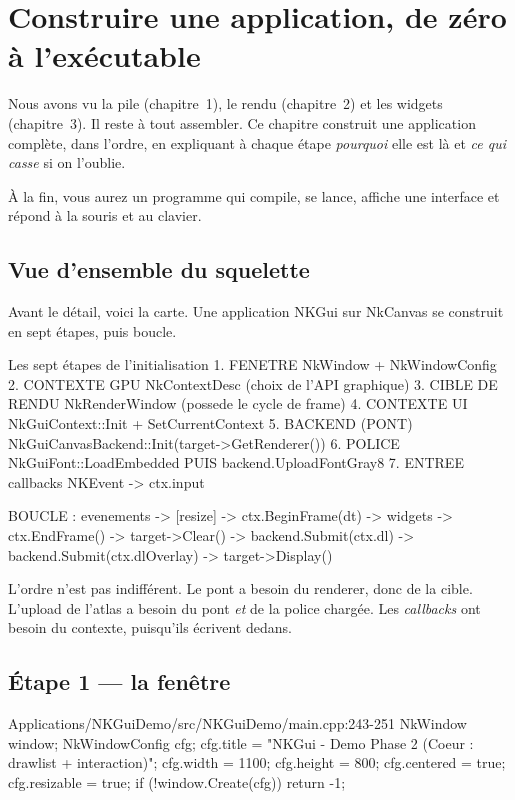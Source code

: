 \chapter{Construire une application, de zéro à l'exécutable}

Nous avons vu la pile (chapitre~1), le rendu (chapitre~2) et les widgets
(chapitre~3). Il reste à tout assembler. Ce chapitre construit une application
complète, dans l'ordre, en expliquant à chaque étape \emph{pourquoi} elle est là
et \emph{ce qui casse} si on l'oublie.

À la fin, vous aurez un programme qui compile, se lance, affiche une interface et
répond à la souris et au clavier.

\section{Vue d'ensemble du squelette}

Avant le détail, voici la carte. Une application NKGui sur NkCanvas se construit
en sept étapes, puis boucle.

\begin{nkcode}{Les sept étapes de l'initialisation}
1. FENETRE          NkWindow + NkWindowConfig
2. CONTEXTE GPU     NkContextDesc  (choix de l'API graphique)
3. CIBLE DE RENDU   NkRenderWindow (possede le cycle de frame)
4. CONTEXTE UI      NkGuiContext::Init + SetCurrentContext
5. BACKEND (PONT)   NkGuiCanvasBackend::Init(target->GetRenderer())
6. POLICE           NkGuiFont::LoadEmbedded  PUIS  backend.UploadFontGray8
7. ENTREE           callbacks NKEvent -> ctx.input

BOUCLE :
   evenements -> [resize] -> ctx.BeginFrame(dt) -> widgets -> ctx.EndFrame()
   -> target->Clear() -> backend.Submit(ctx.dl) -> backend.Submit(ctx.dlOverlay)
   -> target->Display()
\end{nkcode}

L'ordre n'est pas indifférent. Le pont a besoin du renderer, donc de la cible.
L'upload de l'atlas a besoin du pont \emph{et} de la police chargée. Les
\emph{callbacks} ont besoin du contexte, puisqu'ils écrivent dedans.

\section{Étape 1 — la fenêtre}

\begin{nkcode}{Applications/NKGuiDemo/src/NKGuiDemo/main.cpp:243-251}
    NkWindow window;
    NkWindowConfig cfg;
    cfg.title = "NKGui - Demo Phase 2 (Coeur : drawlist + interaction)";
    cfg.width = 1100;
    cfg.height = 800;
    cfg.centered = true;
    cfg.resizable = true;
    if (!window.Create(cfg))
        return -1;
\end{nkcode}

